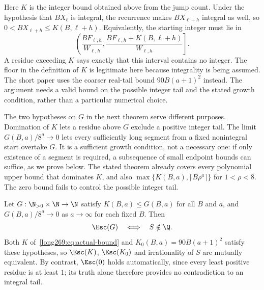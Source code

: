 Here $K$ is the integer bound obtained above from the jump count.
Under the hypothesis that $BX_\ell$ is integral, the recurrence makes
$BX_{\ell+h}$ integral as well, so $0<BX_{\ell+h}\le K(B,\ell+h)$.
Equivalently, the starting integer must lie in
\[
 \left(\frac{BF_{\ell,h}}{W_{\ell,h}},
       \frac{BF_{\ell,h}+K(B,\ell+h)}{W_{\ell,h}}\right].
\]
A residue exceeding $K$ says exactly that this interval contains no
integer. The floor in the definition of $K$ is legitimate here because
integrality is being assumed. The short paper uses the coarser real-tail
bound $90B(a+1)^2$ instead. The argument needs a valid bound on the
possible integer tail and the stated growth condition, rather than a
particular numerical choice.

The two hypotheses on $G$ in the next theorem serve different purposes.
Domination of $K$ lets a residue above $G$ exclude a positive integer tail.
The limit $G(B,a)/8^a\to0$ lets every sufficiently long segment from a
fixed nonintegral start overtake $G$.  It is a sufficient growth condition,
not a necessary one: if only existence of a segment is required, a
subsequence of small endpoint bounds can suffice, as we prove below.
The stated theorem already covers every polynomial upper bound that
dominates $K$, and also $\max\{K(B,a),\lceil B\rho^a\rceil\}$ for
$1<\rho<8$.  The zero bound fails to control the possible integer tail.

\begin{theorem}\label{long269:res:actual-escape-endpoint}
\label{long269:res:lead-escape-equivalence}\label{long269:res:windowconsumer}
Let $G:\N_{>0}\times\N\to\N$ satisfy $K(B,a)\le G(B,a)$ for all $B$ and $a$,
and $G(B,a)/8^{a}\to0$ as $a\to\infty$ for each fixed $B$.  Then
\[
 \Esc(G)\quad\Longleftrightarrow\quad S\notin\Q .
\]
Both $K$ of~\eqref{long269:eq:actual-bound} and $K_0(B,a)=90B(a+1)^{2}$ satisfy these hypotheses, so $\Esc(K)$, $\Esc(K_0)$ and irrationality of $S$ are mutually
equivalent.  By contrast, $\Esc(0)$ holds automatically, since every
least positive residue is at least $1$; its truth alone therefore
provides no contradiction to an integral tail.
\end{theorem}

